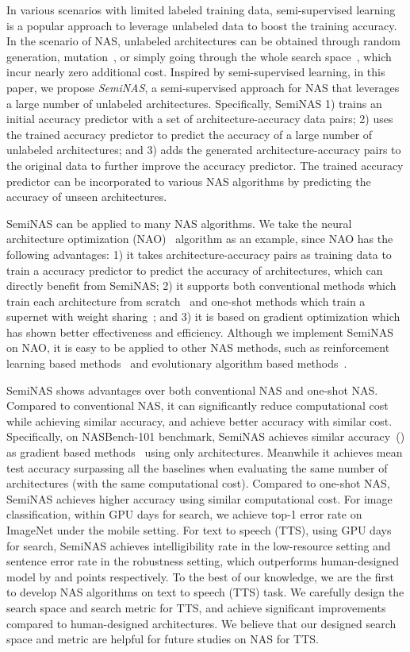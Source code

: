 \documentclass{article}
\begin{document}
In various scenarios with limited labeled training data, semi-supervised learning~\cite{introsemi} is a popular approach to leverage unlabeled data to boost the training accuracy. In the scenario of NAS, unlabeled architectures can be obtained through random generation, mutation~\cite{amoebanet}, or simply going through the whole search space~\cite{neuralpredictor}, which incur nearly zero additional cost. Inspired by semi-supervised learning, in this paper, we propose \emph{SemiNAS}, a semi-supervised approach for NAS that leverages a large number of unlabeled architectures. Specifically, SemiNAS 1) trains an initial accuracy predictor with a set of architecture-accuracy data pairs; 2) uses the trained accuracy predictor to predict the accuracy of a large number of unlabeled architectures; and 3) adds the generated architecture-accuracy pairs to the original data to further improve the accuracy predictor. The trained accuracy predictor can be incorporated to various NAS algorithms by predicting the accuracy of unseen architectures.

SemiNAS can be applied to many NAS algorithms. We take the neural architecture optimization (NAO)~\cite{nao} algorithm as an example, since NAO has the following advantages: 1) it takes architecture-accuracy pairs as training data to train a accuracy predictor to predict the accuracy of architectures, which can directly benefit from SemiNAS; 2) it supports both conventional methods which train each architecture from scratch~\cite{nasnet,amoebanet,nao} and one-shot methods which train a supernet with weight sharing~\cite{enas,nao}; and 3) it is based on gradient optimization which has shown better effectiveness and efficiency. Although we implement SemiNAS on NAO, it is easy to be applied to other NAS methods, such as reinforcement learning based methods~\cite{nasnet,enas} and evolutionary algorithm based methods~\cite{amoebanet}. 

SemiNAS shows advantages over both conventional NAS and one-shot NAS. Compared to conventional NAS, it can significantly reduce computational cost while achieving similar accuracy, and achieve better accuracy with similar cost. Specifically, on NASBench-101 benchmark, SemiNAS achieves similar accuracy~() as gradient based methods~\cite{nao} using only  architectures. Meanwhile it achieves  mean test accuracy surpassing all the baselines when evaluating the same number of architectures (with the same computational cost). Compared to one-shot NAS, SemiNAS achieves higher accuracy using similar computational cost. For image classification, within  GPU days for search, we achieve  top-1 error rate on ImageNet under the mobile setting. For text to speech (TTS), using  GPU days for search, SemiNAS achieves  intelligibility rate in the low-resource setting and  sentence error rate in the robustness setting, which outperforms human-designed model by  and  points respectively. To the best of our knowledge, we are the first to develop NAS algorithms on text to speech (TTS) task. We carefully design the search space and search metric for TTS, and achieve significant improvements compared to human-designed architectures. We believe that our designed search space and metric are helpful for future studies on NAS for TTS.
\end{document}
